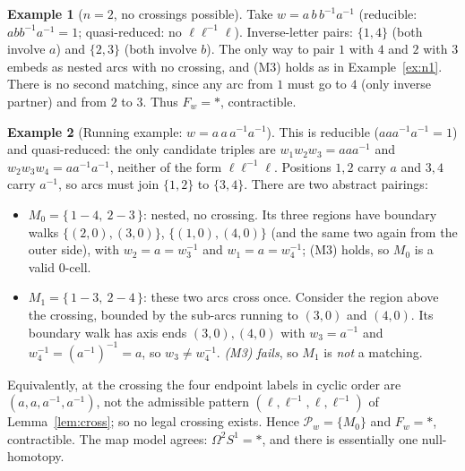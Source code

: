 \documentclass[11pt]{article}
\theoremstyle{definition}
\newtheorem{example}{Example}
\theoremstyle{remark}
\begin{document}
\begin{example}[$n=2$, no crossings possible]\label{ex:n2}
Take $w=a\,b\,b^{-1}a^{-1}$ (reducible: $abb^{-1}a^{-1}=1$; quasi-reduced: no
$\ell\ell^{-1}\ell$). Inverse-letter pairs: $\{1,4\}$ (both involve $a$) and
$\{2,3\}$ (both involve $b$). The only way to pair $1$ with $4$ and $2$ with $3$
embeds as nested arcs with no crossing, and (M3) holds as in
Example~\ref{ex:n1}. There is no second matching, since any arc from $1$ must go
to $4$ (only inverse partner) and from $2$ to $3$. Thus $F_w=\ast$, contractible.
\end{example}

\begin{example}[Running example: $w=a\,a\,a^{-1}a^{-1}$]\label{ex:run}
This is reducible ($aaa^{-1}a^{-1}=1$) and quasi-reduced: the only candidate
triples are $w_1w_2w_3=aaa^{-1}$ and $w_2w_3w_4=aa^{-1}a^{-1}$, neither of the
form $\ell\ell^{-1}\ell$. Positions $1,2$ carry $a$ and $3,4$ carry $a^{-1}$, so
arcs must join $\{1,2\}$ to $\{3,4\}$. There are two abstract pairings:
\begin{itemize}
\item $M_0=\{\,1\!-\!4,\ 2\!-\!3\,\}$: nested, no crossing. Its three regions have
boundary walks $\{(2,0),(3,0)\}$, $\{(1,0),(4,0)\}$ (and the same two again from
the outer side), with $w_2=a=w_3^{-1}$ and $w_1=a=w_4^{-1}$; (M3) holds, so $M_0$
is a valid $0$-cell.
\item $M_1=\{\,1\!-\!3,\ 2\!-\!4\,\}$: these two arcs cross once. Consider the
region above the crossing, bounded by the sub-arcs running to $(3,0)$ and
$(4,0)$. Its boundary walk has axis ends $(3,0),(4,0)$ with
$w_3=a^{-1}$ and $w_4^{-1}=(a^{-1})^{-1}=a$, so $w_3\ne w_4^{-1}$. \emph{(M3)
fails}, so $M_1$ is \emph{not} a matching.
\end{itemize}
Equivalently, at the crossing the four endpoint labels in cyclic order are
$(a,a,a^{-1},a^{-1})$, not the admissible pattern $(\ell,\ell^{-1},\ell,\ell^{-1})$
of Lemma~\ref{lem:cross}; so no legal crossing exists. Hence $\mathcal
P_w=\{M_0\}$ and $F_w=\ast$, contractible. The map model agrees:
$\Omega^2 S^1=\ast$, and there is essentially one null-homotopy.
\end{example}
\end{document}

